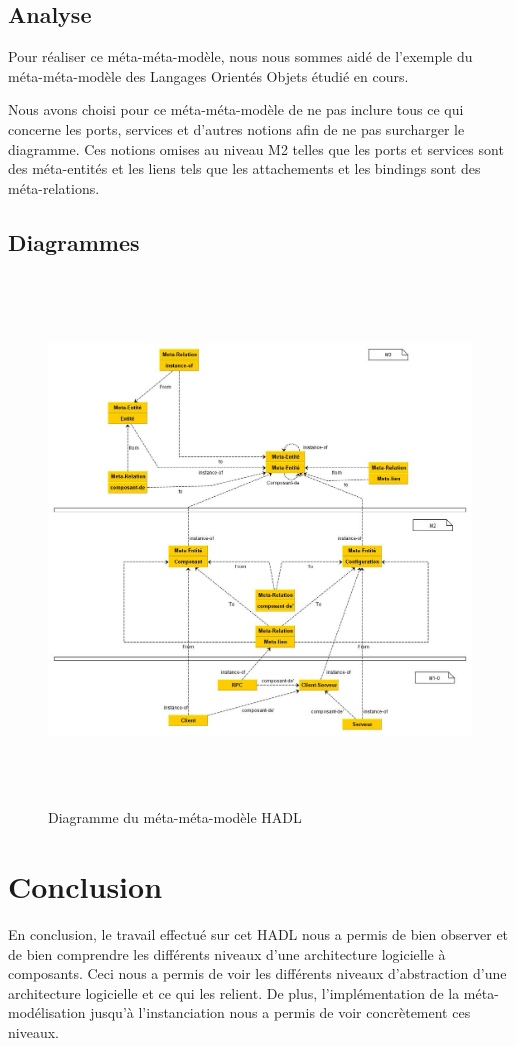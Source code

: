 \documentclass[11pt,a4paper]{article}
\begin{document}
\subsection{Analyse}
Pour réaliser ce méta-méta-modèle, nous nous sommes aidé de l'exemple du
méta-méta-modèle des Langages Orientés Objets étudié en cours. 

Nous avons choisi pour ce méta-méta-modèle de ne pas inclure tous ce qui concerne
les ports, services et d'autres notions afin de ne pas surcharger le diagramme.
Ces notions omises au niveau M2 telles que les ports et services sont des
méta-entités et les liens tels que les attachements et les bindings sont des
méta-relations.
\subsection{Diagrammes}

\begin{figure}[h]
  		\centering
  		\includegraphics[height=14cm,width=15cm]{meta-meta-modele.jpg}
  		\caption{Diagramme du méta-méta-modèle HADL}
  		\label{Diagramme du méta-méta-modèle HADL}
\end{figure}


\section{Conclusion}

En conclusion, le travail effectué sur cet HADL nous a permis de bien observer
et de bien comprendre les différents niveaux d'une architecture logicielle à
composants. Ceci nous a permis de voir les différents niveaux d'abstraction
d'une architecture logicielle et ce qui les relient. De plus, l'implémentation
de la méta-modélisation jusqu'à l'instanciation nous a permis de voir
concrètement ces niveaux.
\end{document}

